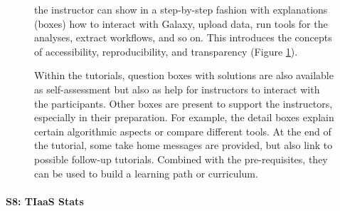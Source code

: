 \documentclass[10pt,letterpaper]{article}
\begin{document}
\begin{figure}[!ht]
{	 the instructor can show in a step-by-step fashion with explanations (boxes) how to interact with Galaxy, upload data, run tools for the analyses, extract workflows, and so on. This introduces the concepts of accessibility, reproducibility, and transparency (Figure \ref{fig:tutorial-skeleton}). 

Within the tutorials, question boxes with solutions are also available as self-assessment but also as help for instructors to interact with the participants. Other boxes are present to support the instructors, especially in their preparation.
For example, the detail boxes explain certain algorithmic aspects or compare different tools.
At the end of the tutorial, some take home messages are provided, but also link to possible follow-up tutorials.
Combined with the pre-requisites, they can be used to build a learning path or curriculum.
	
	
	\label{fig:tutorial-skeleton}}
\end{figure}

\paragraph{S8: TIaaS Stats}
\end{document}
